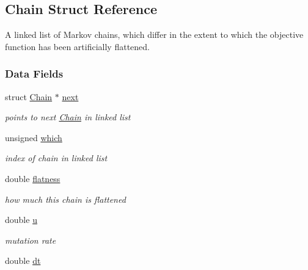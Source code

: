 \hypertarget{struct_chain}{\subsection{Chain Struct Reference}
\label{struct_chain}
}


A linked list of Markov chains, which differ in the extent to which the objective function has been artificially flattened.  


\subsubsection*{Data Fields}
\begin{DoxyCompactItemize}
\item 
\hypertarget{struct_chain_a4a72dbd38d8d5ace36a3f9228bef05e6}{struct \hyperlink{struct_chain}{Chain} $\ast$ \hyperlink{struct_chain_a4a72dbd38d8d5ace36a3f9228bef05e6}{next}}\label{struct_chain_a4a72dbd38d8d5ace36a3f9228bef05e6}

\begin{DoxyCompactList}\small\item\em points to next \hyperlink{struct_chain}{Chain} in linked list \end{DoxyCompactList}\item 
\hypertarget{struct_chain_acf3931e85fd873f46d72ef82de52b1fd}{unsigned \hyperlink{struct_chain_acf3931e85fd873f46d72ef82de52b1fd}{which}}\label{struct_chain_acf3931e85fd873f46d72ef82de52b1fd}

\begin{DoxyCompactList}\small\item\em index of chain in linked list \end{DoxyCompactList}\item 
\hypertarget{struct_chain_a900345372482091304b3a1721577369a}{double \hyperlink{struct_chain_a900345372482091304b3a1721577369a}{flatness}}\label{struct_chain_a900345372482091304b3a1721577369a}

\begin{DoxyCompactList}\small\item\em how much this chain is flattened \end{DoxyCompactList}\item 
\hypertarget{struct_chain_a98e9043526075232bfe24aac37119f6a}{double \hyperlink{struct_chain_a98e9043526075232bfe24aac37119f6a}{u}}\label{struct_chain_a98e9043526075232bfe24aac37119f6a}

\begin{DoxyCompactList}\small\item\em mutation rate \end{DoxyCompactList}\item 
\hypertarget{struct_chain_a392fb5e9e408b49f008524cb7eabc8b0}{double \hyperlink{struct_chain_a392fb5e9e408b49f008524cb7eabc8b0}{dt}}\label{struct_chain_a392fb5e9e408b49f008524cb7eabc8b0}


\end{DoxyCompactItemize}
